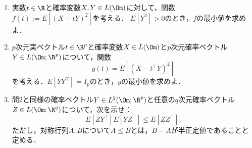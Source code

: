\documentclass[uplatex,dvipdfmx]{jsarticle}
\begin{document}
\begin{tcolorbox}[colframe=ForestGreen, colback=ForestGreen!10!white,breakable,colbacktitle=ForestGreen!40!white,coltitle=black,fonttitle=\bfseries\sffamily,
    title=第３問]
    \begin{problem}\mbox{}\label{prob-15-8-3}
        \begin{enumerate}[{問}1]
            \item 実数$t\in\R$と確率変数$X,Y\in L(\Om)$に対して，関数$f(t):=E[(X-tY)^2]$を考える．
            $E[Y^2]>0$のとき，$f$の最小値を求めよ．
            \item $p$次元実ベクトル$t\in\R^p$と確率変数$X\in L(\Om)$と$p$次元確率ベクトル$Y\in L(\Om;\R^p)$について，関数
            \[g(t)=E[(X-t^\top Y)^2]\]
            を考える．$E[YY^\top]=I_p$のとき，$g$の最小値を求めよ．
            \item 問2と同様の確率ベクトル$Y\in L^2(\Om;\R^p)$と任意の$q$次元確率ベクトル$Z\in L(\Om;\R^q)$について，次を示せ：
            \[E[ZY^\top]E[YZ^\top]\le E[ZZ^\top].\]
            ただし，対称行列$A,B$について$A\le B$とは，$B-A$が半正定値であることと定める．
        \end{enumerate}
    \end{problem}
\end{tcolorbox}
\end{document}
